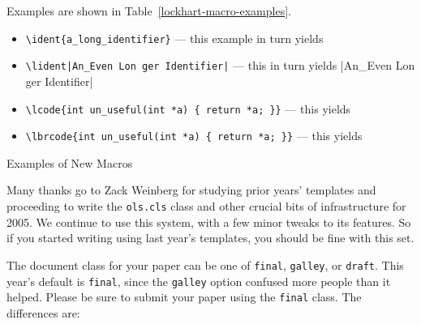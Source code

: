 \documentclass[final]{ols}
\begin{document}
Examples are shown in Table~\ref{lockhart-macro-examples}.

\begin{table*}[tb]
\begin{shaded}
\begin{itemize}
\item \verb|\ident{a_long_identifier}| --- this example in turn yields 

\item \texttt{{\textbackslash}lident|An\_Even Lon ger Identifier|} --- this
  in turn
  yields \lident|An_Even Lon ger Identifier|

\item \verb|\lcode{int un_useful(int *a) { return *a; }}| --- this
  yields

\item \verb|\lbrcode{int un_useful(int *a) { return *a; }}| --- this
  yields

\end{itemize}
\caption{Examples of New Macros}
\label{lockhart-macro-examples}
\end{shaded}
\end{table*}

Many thanks go to Zack Weinberg for studying prior years' templates and
proceeding to write the \texttt{ols.cls} class and other crucial bits of
infrastructure for 2005.  We continue to use this system, with a few minor
tweaks to its features.  So if you started writing using last year's
templates, you should be fine with this set.

The document class for your paper can be one of \texttt{final},
\texttt{galley}, or \texttt{draft}.  This year's default is
\texttt{final}, since the \texttt{galley} option confused more people
than it helped.  Please be sure to submit your paper using the
\texttt{final} class.  The differences are:
\end{document}
